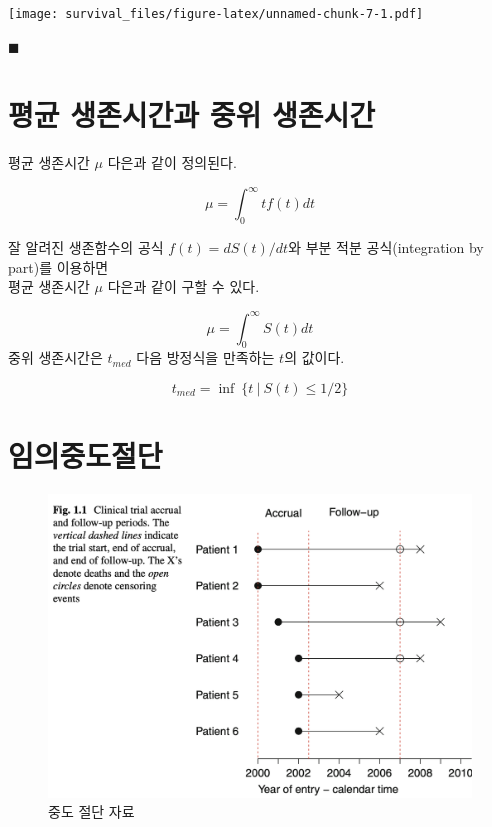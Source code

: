\documentclass[
]{book}
\theoremstyle{definition}
\theoremstyle{definition}
\theoremstyle{definition}
\theoremstyle{definition}
\theoremstyle{remark}
\begin{document}
\texttt{[image: survival\_files/figure-latex/unnamed-chunk-7-1.pdf]}

\(\blacksquare\)

\hypertarget{uxd3c9uxade0-uxc0dduxc874uxc2dcuxac04uxacfc-uxc911uxc704-uxc0dduxc874uxc2dcuxac04}{%
\section{평균 생존시간과 중위 생존시간}\label{uxd3c9uxade0-uxc0dduxc874uxc2dcuxac04uxacfc-uxc911uxc704-uxc0dduxc874uxc2dcuxac04}}

평균 생존시간 \(\mu\) 다은과 같이 정의된다.

\[ \mu = \int_{0}^\infty t f(t) dt \]

잘 알려진 생존함수의 공식 \(f(t) = dS(t)/dt\)와 부분 적분 공식(integration by part)를 이용하면\\
평균 생존시간 \(\mu\) 다은과 같이 구할 수 있다.

\[ \mu = \int_0^\infty S(t)dt \]
중위 생존시간은 \(t_{med}\) 다음 방정식을 만족하는 \(t\)의 값이다.

\[ t_{med} = \inf ~ \{t~|~ S(t) \le 1/2 \} \]

\hypertarget{uxc784uxc758uxc911uxb3c4uxc808uxb2e8}{%
\section{임의중도절단}\label{uxc784uxc758uxc911uxb3c4uxc808uxb2e8}}

\begin{figure}
\centering
\includegraphics{images/censoring.png}
\caption{중도 절단 자료}
\end{figure}
\end{document}
